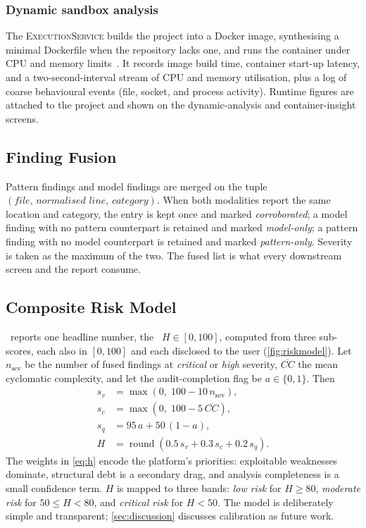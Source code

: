 \subsubsection{Dynamic sandbox analysis}
\label{sec:dynamic}
The \textsc{ExecutionService} builds the project into a Docker
image, synthesising a minimal Dockerfile when the repository lacks
one, and runs the container under CPU and memory
limits~\cite{merkel2014docker}. It records image build time, container
start-up latency, and a two-second-interval stream of CPU and memory
utilisation, plus a log of coarse behavioural events (file, socket, and
process activity). Runtime figures are attached to the project and shown
on the dynamic-analysis and container-insight screens.

\subsection{Finding Fusion}
\label{sec:fusion}
Pattern findings and model findings are merged on the tuple
$(\textit{file},\, \textit{normalised line},\, \textit{category})$.
When both modalities report the same location and category, the entry is
kept once and marked \emph{corroborated}; a model finding with no
pattern counterpart is retained and marked \emph{model-only}; a pattern
finding with no model counterpart is retained and marked
\emph{pattern-only}. Severity is taken as the maximum of the two. The
fused list is what every downstream screen and the report consume.

\subsection{Composite Risk Model}
\label{sec:risk}


\cs\ reports one headline number, the \phindex\ $H \in [0,100]$, computed
from three sub-scores, each also in $[0,100]$ and each disclosed to the
user (\cref{fig:riskmodel}). Let $n_{\text{sev}}$ be the number of fused
findings at \emph{critical} or \emph{high} severity, $\overline{CC}$ the
mean cyclomatic complexity, and let the audit-completion flag be
$a \in \{0,1\}$. Then
\begin{align}
 s_v &= \max\!\left(0,\; 100 - 10\, n_{\text{sev}}\right), \label{eq:sv}\\
 s_c &= \max\!\left(0,\; 100 - 5\, \overline{CC}\right), \label{eq:sc}\\
 s_q &= 95\,a + 50\,(1-a), \label{eq:sq}\\
 H &= \operatorname{round}\!\left(0.5\, s_v + 0.3\, s_c + 0.2\, s_q\right).
 \label{eq:h}
\end{align}
The weights in \cref{eq:h} encode the platform's priorities: exploitable
weaknesses dominate, structural debt is a secondary drag, and analysis
completeness is a small confidence term. $H$ is mapped to three bands:
\emph{low risk} for $H \ge 80$, \emph{moderate risk} for
$50 \le H < 80$, and \emph{critical risk} for $H < 50$. The model is
deliberately simple and transparent; \cref{sec:discussion} discusses
calibration as future work.

